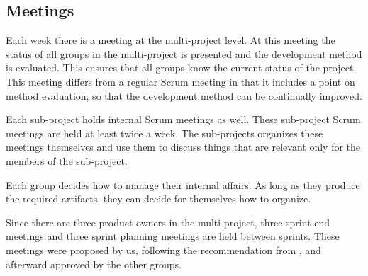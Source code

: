 \subsection{Meetings}\label{sec:meetings}
Each week there is a meeting at the multi-project level. At this meeting the status of all groups in the multi-project is presented and the development method is evaluated. This ensures that all groups know the current status of the project. This meeting differs from a regular Scrum meeting in that it includes a point on method evaluation, so that the development method can be continually improved.

Each sub-project holds internal Scrum meetings as well. These sub-project Scrum meetings are held at least twice a week. The sub-projects organizes these meetings themselves and use them to discuss things that are relevant only for the members of the sub-project. 

Each group decides how to manage their internal affairs. As long as they produce the required artifacts, they can decide for themselves how to organize.

Since there are three product owners in the multi-project, three sprint end meetings and three sprint planning meetings are held between sprints. These meetings were proposed by us, following the recommendation from \textcite{bird_davies_2007}, and afterward approved by the other groups.

